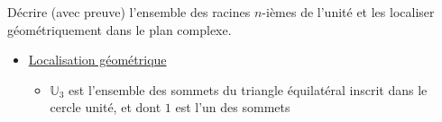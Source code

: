 \documentclass{article}
\renewenvironment{question_kholle}[2][ ]
{
	\subsection{\texorpdfstring{#2}{}}
	\notblank{#1}
	{
		\noindent #1
		\bigbreak
	}
	{}
	\begin{proof}
}
{
	\end{proof}
}
\begin{document}
\begin{question_kholle}{Décrire (avec preuve) l'ensemble des racines $n$-ièmes de l'unité et les localiser géométriquement dans le plan complexe.}
\begin{itemize}
\begin{align*}
\begin{array}{ll}
                      \rho = 1 \text{ car } \rho > 0                \\
                      \theta \equiv 0 \left[ \frac{2\pi}{n} \right] \\
                      z = \rho e^{i \theta}                         \\
                      (\rho, \theta) \in \mathbb{R}_{+}^{*}\times \mathbb{R}
                    \end{array}\right.
            \\ & \iff
            \left\{ \begin{array}{ll}
                      \rho = 1                                            \\
                      \exists k \in \mathbb{Z} : \theta = \frac{2k\pi}{n} \\
                      z = \rho e^{i \theta}                               \\
                      (\rho, \theta) \in \mathbb{R}_{+}^{*}\times \mathbb{R}
                    \end{array}\right.
            \\  & \iff \exists k \in \mathbb{Z}: z=e^{\frac{2ik\pi}{n}} \\
             & \iff z \in \left\{ e^{\frac{2ik\pi}{n}}\mid k \in \mathbb{Z} \right\}
          \end{align*}


          L'ensemble des solutions est paramétré par l'entier $k$ qui parcourt un ensemble infini. Toutefois, en représentant graphiquement les solutions, il semblerait que "tous les $n$", on fait un tour de cercle trigonométrique de plus, en redécrivant les solutions déjà obtenues pour $k \in [ \! [ 0, n-1 ] \!]$.
    \item \underline{Localisation géométrique}
          \begin{itemize}[label=$\star$]
            \item $\mathbb U _3$ est l'ensemble des sommets du triangle équilatéral inscrit dans le cercle unité, et dont $1$ est l'un des sommets


\end{itemize}
\end{itemize}
\end{question_kholle}
\end{document}
